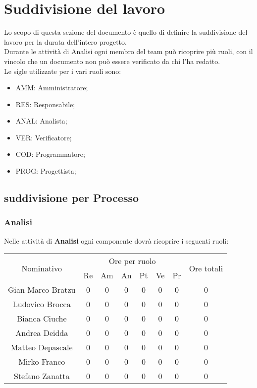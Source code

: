 \chapter{Suddivisione del lavoro}
Lo scopo di questa sezione del documento è quello di definire la suddivisione del lavoro per la durata dell'intero progetto.\\
Durante le attività di Analisi ogni membro del team può ricoprire più ruoli, con il vincolo che un documento non può essere verificato da chi l'ha redatto.\\
Le sigle utilizzate per i vari ruoli sono:
\begin{itemize}
	\item AMM: Amministratore;
	\item RES: Responsabile;
	\item ANAL: Analista;
	\item VER: Verificatore;
	\item COD: Programmatore;
	\item PROG: Progettista;
\end{itemize}

\section{suddivisione per Processo}
\subsection{Analisi}
Nelle attività di \textbf{Analisi} ogni componente dovrà ricoprire i seguenti ruoli:

\begin{table}[]
	\begin{tabular}{|c|c|c|c|c|c|c|c|}
		\hline
		\multirow{2}{*}{Nominativo}             & \multicolumn{6}{c|}{Ore per ruolo}                                                                                                                     & \multirow{2}{*}{Ore totali} \\ \cline{2-7}
		& \multicolumn{1}{c|}{Re} & \multicolumn{1}{c|}{Am} & \multicolumn{1}{c|}{An} & \multicolumn{1}{c|}{Pt} & \multicolumn{1}{c|}{Ve} & \multicolumn{1}{c|}{Pr} &                             \\ \hline
			Gian Marco Bratzu	&0	&0	&0	&0	&0	&0	&0     \\
			Ludovico Brocca		&0	&0	&0	&0	&0	&0	&0     \\ 
			Bianca Ciuche		&0	&0	&0	&0	&0	&0	&0     \\ 
			Andrea Deidda		&0	&0	&0	&0	&0	&0	&0     \\
			Matteo Depascale	&0	&0	&0	&0	&0	&0	&0     \\
			Mirko Franco		&0	&0	&0	&0	&0	&0	&0     \\
			Stefano Zanatta		&0	&0	&0	&0	&0	&0	&0     \\ \hline
		               
	\end{tabular}
\end{table}

